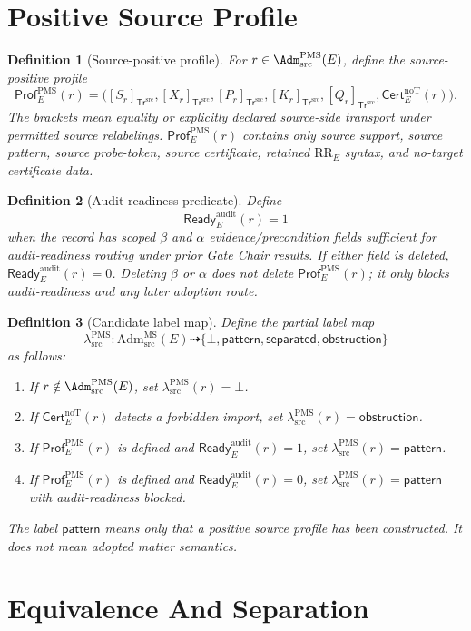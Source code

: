 \documentclass[11pt]{article}
\newcommand{\AdmSrc}{\mathrm{Adm}^{\mathrm{MS}}_{\mathrm{src}}}
\newcommand{\lambdaProf}{\lambda^{\mathrm{PMS}}_{\mathrm{src}}}
\newcommand{\Bottom}{\bot}
\newcommand{\Pattern}{\mathsf{pattern}}
\newcommand{\Separated}{\mathsf{separated}}
\newcommand{\Obstruction}{\mathsf{obstruction}}
\newcommand{\RRE}{\mathrm{RR}_E}
\newcommand{\Prof}{\mathsf{Prof}^{\mathrm{PMS}}_E}
\newcommand{\Ready}{\mathsf{Ready}^{\mathrm{audit}}_E}
\newcommand{\Cert}{\mathsf{Cert}^{\mathrm{noT}}_E}
\newcommand{\Transport}{\mathsf{Tr}^{\mathrm{src}}}
\newtheorem{definition}{Definition}
\begin{document}
\section{Positive Source Profile}

\begin{definition}[Source-positive profile]
For \(r\in\Adm^{\mathrm{PMS}}_{\mathrm{src}}(E)\), define the source-positive
profile
\[
  \Prof(r)=
  \bigl([S_r]_{\Transport},[X_r]_{\Transport},
  [P_r]_{\Transport},[K_r]_{\Transport},[Q_r]_{\Transport},
  \Cert(r)\bigr).
\]
The brackets mean equality or explicitly declared source-side transport under
permitted source relabelings. \(\Prof(r)\) contains only source support,
source pattern, source probe-token, source certificate, retained \(\RRE\)
syntax, and no-target certificate data.
\end{definition}

\begin{definition}[Audit-readiness predicate]
Define
\[
  \Ready(r)=1
\]
when the record has scoped \(\beta\) and \(\alpha\) evidence/precondition
fields sufficient for audit-readiness routing under prior Gate Chair results.
If either field is deleted, \(\Ready(r)=0\). Deleting \(\beta\) or \(\alpha\)
does not delete \(\Prof(r)\); it only blocks audit-readiness and any later
adoption route.
\end{definition}

\begin{definition}[Candidate label map]
Define the partial label map
\[
  \lambdaProf:\AdmSrc(E)\dashrightarrow
  \{\Bottom,\Pattern,\Separated,\Obstruction\}
\]
as follows:
\begin{enumerate}[label=L\arabic*.,leftmargin=*]
  \item If \(r\notin\Adm^{\mathrm{PMS}}_{\mathrm{src}}(E)\), set
  \(\lambdaProf(r)=\Bottom\).
  \item If \(\Cert(r)\) detects a forbidden import, set
  \(\lambdaProf(r)=\Obstruction\).
  \item If \(\Prof(r)\) is defined and \(\Ready(r)=1\), set
  \(\lambdaProf(r)=\Pattern\).
  \item If \(\Prof(r)\) is defined and \(\Ready(r)=0\), set
  \(\lambdaProf(r)=\Pattern\) with audit-readiness blocked.
\end{enumerate}
The label \(\Pattern\) means only that a positive source profile has been
constructed. It does not mean adopted matter semantics.
\end{definition}

\section{Equivalence And Separation}
\end{document}
